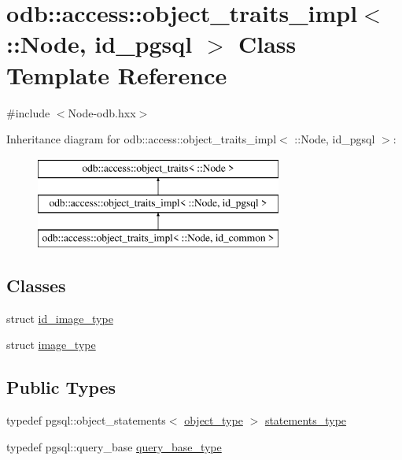 \hypertarget{classodb_1_1access_1_1object__traits__impl_3_01_1_1_node_00_01id__pgsql_01_4}{}\section{odb\+:\+:access\+:\+:object\+\_\+traits\+\_\+impl$<$ \+:\+:Node, id\+\_\+pgsql $>$ Class Template Reference}
\label{classodb_1_1access_1_1object__traits__impl_3_01_1_1_node_00_01id__pgsql_01_4}


{\ttfamily \#include $<$Node-\/odb.\+hxx$>$}

Inheritance diagram for odb\+:\+:access\+:\+:object\+\_\+traits\+\_\+impl$<$ \+:\+:Node, id\+\_\+pgsql $>$\+:\begin{figure}[H]
\begin{center}
\leavevmode
\includegraphics[height=3.000000cm]{de/d26/classodb_1_1access_1_1object__traits__impl_3_01_1_1_node_00_01id__pgsql_01_4}
\end{center}
\end{figure}
\subsection*{Classes}
\begin{DoxyCompactItemize}
\item 
struct \hyperlink{structodb_1_1access_1_1object__traits__impl_3_01_1_1_node_00_01id__pgsql_01_4_1_1id__image__type}{id\+\_\+image\+\_\+type}
\item 
struct \hyperlink{structodb_1_1access_1_1object__traits__impl_3_01_1_1_node_00_01id__pgsql_01_4_1_1image__type}{image\+\_\+type}
\end{DoxyCompactItemize}
\subsection*{Public Types}
\begin{DoxyCompactItemize}
\item 
typedef pgsql\+::object\+\_\+statements$<$ \hyperlink{classodb_1_1access_1_1object__traits_3_01_1_1_node_01_4_a3e752d47556347fa6f6aed44cf92c0aa}{object\+\_\+type} $>$ \hyperlink{classodb_1_1access_1_1object__traits__impl_3_01_1_1_node_00_01id__pgsql_01_4_ac387d48078d92bd85fcfd24b710fd7e6}{statements\+\_\+type}
\item 
typedef pgsql\+::query\+\_\+base \hyperlink{classodb_1_1access_1_1object__traits__impl_3_01_1_1_node_00_01id__pgsql_01_4_ae2db30bff69cc56f29d45406604fcf9b}{query\+\_\+base\+\_\+type}
\end{DoxyCompactItemize}
